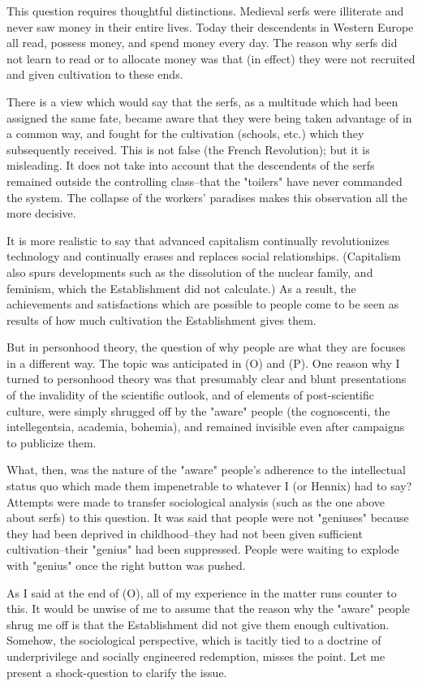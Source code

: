 This question requires thoughtful distinctions. Medieval serfs were illiterate and never saw money in their entire lives. Today their descendents in Western Europe all read, possess money, and spend money every day. The reason why serfs did not learn to read or to allocate money was that (in effect) they were not recruited and given cultivation to these ends.

There is a view which would say that the serfs, as a multitude which had been assigned the same fate, became aware that they were being taken advantage of in a common way, and fought for the cultivation (schools, etc.) which they subsequently received. This is not false (the French Revolution); but it is misleading. It does not take into account that the descendents of the serfs remained outside the controlling class--that the "toilers" have never commanded the system. The collapse of the workers' paradises makes this observation all the more decisive.

It is more realistic to say that advanced capitalism continually revolutionizes technology and continually erases and replaces social relationships. (Capitalism also spurs developments such as the dissolution of the nuclear family, and feminism, which the Establishment did not calculate.) As a result, the achievements and satisfactions which are possible to people come to be seen as results of how much cultivation the Establishment gives them.

But in personhood theory, the question of why people are what they are focuses in a different way. The topic was anticipated in (O) and (P). One reason why I turned to personhood theory was that presumably clear and blunt presentations of the invalidity of the scientific outlook, and of elements of post-scientific culture, were simply shrugged off by the "aware" people (the cognoscenti, the intellegentsia, academia, bohemia), and remained invisible even after campaigns to publicize them.

What, then, was the nature of the "aware" people's adherence to the intellectual status quo which made them impenetrable to whatever I (or Hennix) had to say? Attempts were made to transfer sociological analysis (such as the one above about serfs) to this question. It was said that people were not "geniuses" because they had been deprived in childhood--they had not been given sufficient cultivation--their "genius" had been suppressed. People were waiting to explode with "genius" once the right button was pushed.

As I said at the end of (O), all of my experience in the matter runs counter to this. It would be unwise of me to assume that the reason why the "aware" people shrug me off is that the Establishment did not give them enough cultivation. Somehow, the sociological perspective, which is tacitly tied to a doctrine of underprivilege and socially engineered redemption, misses the point. Let me present a shock-question to clarify the issue.

